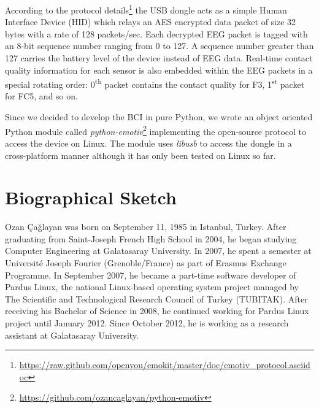 \documentclass[12pt]{article}
\numberwithin{equation}{section}
\numberwithin{figure}{section}
\numberwithin{table}{section}
\begin{document}
\par{
According to the protocol details\footnote{\url{https://raw.github.com/openyou/emokit/master/doc/emotiv_protocol.asciidoc}}
the USB dongle acts as a simple Human Interface Device (HID) which relays an AES encrypted data packet of size 32 bytes with a rate of 128 packets/sec.
Each decrypted EEG packet is tagged with an 8-bit sequence number ranging from 0 to 127.
A sequence number greater than 127 carries the battery level of the device instead of EEG data.
Real-time contact quality information for each sensor is also embedded within the EEG
packets in a special rotating order: 0\textsuperscript{th} packet contains the contact quality for F3,
1\textsuperscript{st} packet for FC5, and so on.
}

\par{
Since we decided to develop the BCI in pure Python, we wrote an object oriented
Python module called \emph{python-emotiv}\footnote{\url{https://github.com/ozancaglayan/python-emotiv}}
implementing the open-source protocol to access the device on Linux. The module uses \emph{libusb}
to access the dongle in a cross-platform manner although it has only been tested on Linux
so far.
}


\clearpage
\vspace*{-0.35cm}

\thispagestyle{empty}


\clearpage
\cfoot{}
\vspace*{-0.35cm}
\thispagestyle{empty}
\section*{Biographical Sketch}
\vspace*{6pt}
\par{
Ozan Çağlayan was born on September 11, 1985 in Istanbul, Turkey. After graduating from Saint-Joseph French High School in 2004,
he began studying Computer Engineering at Galatasaray University. In 2007, he spent a semester at Université Joseph Fourier (Grenoble/France) as part of Erasmus Exchange Programme.
In September 2007, he became a part-time software developer of Pardus Linux, the national Linux-based operating system project
managed by The Scientific and Technological Research Council of Turkey (TUBITAK). After receiving his Bachelor of Science in 2008, he continued working for Pardus Linux project until January 2012.
Since October 2012, he is working as a research assistant at Galatasaray University.
}
\clearpage
\end{document}
